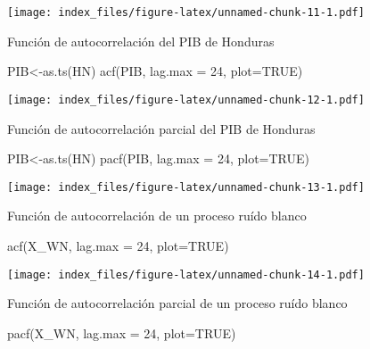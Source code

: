 \documentclass[
]{book}
\newenvironment{Shaded}{\begin{snugshade}}{\end{snugshade}}
\newcommand{\AttributeTok}[1]{\textcolor[rgb]{0.77,0.63,0.00}{#1}}
\newcommand{\ConstantTok}[1]{\textcolor[rgb]{0.00,0.00,0.00}{#1}}
\newcommand{\DecValTok}[1]{\textcolor[rgb]{0.00,0.00,0.81}{#1}}
\newcommand{\FunctionTok}[1]{\textcolor[rgb]{0.00,0.00,0.00}{#1}}
\newcommand{\NormalTok}[1]{#1}
\newcommand{\OtherTok}[1]{\textcolor[rgb]{0.56,0.35,0.01}{#1}}
\begin{document}
\texttt{[image: index\_files/figure-latex/unnamed-chunk-11-1.pdf]}

Función de autocorrelación del PIB de Honduras

\begin{Shaded}
\begin{Highlighting}[]
\NormalTok{PIB}\OtherTok{\textless{}{-}}\FunctionTok{as.ts}\NormalTok{(HN)}
\FunctionTok{acf}\NormalTok{(PIB, }\AttributeTok{lag.max =} \DecValTok{24}\NormalTok{, }\AttributeTok{plot=}\ConstantTok{TRUE}\NormalTok{)}
\end{Highlighting}
\end{Shaded}

\texttt{[image: index\_files/figure-latex/unnamed-chunk-12-1.pdf]}

Función de autocorrelación parcial del PIB de Honduras

\begin{Shaded}
\begin{Highlighting}[]
\NormalTok{PIB}\OtherTok{\textless{}{-}}\FunctionTok{as.ts}\NormalTok{(HN)}
\FunctionTok{pacf}\NormalTok{(PIB, }\AttributeTok{lag.max =} \DecValTok{24}\NormalTok{, }\AttributeTok{plot=}\ConstantTok{TRUE}\NormalTok{)}
\end{Highlighting}
\end{Shaded}

\texttt{[image: index\_files/figure-latex/unnamed-chunk-13-1.pdf]}

Función de autocorrelación de un proceso ruído blanco

\begin{Shaded}
\begin{Highlighting}[]
\FunctionTok{acf}\NormalTok{(X\_WN, }\AttributeTok{lag.max =} \DecValTok{24}\NormalTok{, }\AttributeTok{plot=}\ConstantTok{TRUE}\NormalTok{)}
\end{Highlighting}
\end{Shaded}

\texttt{[image: index\_files/figure-latex/unnamed-chunk-14-1.pdf]}

Función de autocorrelación parcial de un proceso ruído blanco

\begin{Shaded}
\begin{Highlighting}[]
\FunctionTok{pacf}\NormalTok{(X\_WN, }\AttributeTok{lag.max =} \DecValTok{24}\NormalTok{, }\AttributeTok{plot=}\ConstantTok{TRUE}\NormalTok{)}
\end{Highlighting}
\end{Shaded}
\end{document}
